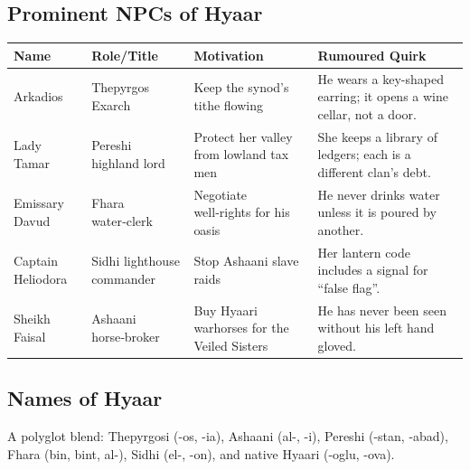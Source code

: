 \documentclass[11pt]{book}
\begin{document}
\subsection*{Prominent NPCs of Hyaar}
\begin{longtable}{|p{}|p{}|p{}|p{}|}
\hline
\textbf{Name} & \textbf{Role/Title} & \textbf{Motivation} & \textbf{Rumoured Quirk} \\
\hline
Arkadios & Thepyrgos Exarch & Keep the synod’s tithe flowing & He wears a key-shaped earring; it opens a wine cellar, not a door. \\
\hline
Lady Tamar & Pereshi highland lord & Protect her valley from lowland tax men & She keeps a library of ledgers; each is a different clan’s debt. \\
\hline
Emissary Davud & Fhara water‑clerk & Negotiate well‑rights for his oasis & He never drinks water unless it is poured by another. \\
\hline
Captain Heliodora & Sidhi lighthouse commander & Stop Ashaani slave raids & Her lantern code includes a signal for “false flag”. \\
\hline
Sheikh Faisal & Ashaani horse‑broker & Buy Hyaari warhorses for the Veiled Sisters & He has never been seen without his left hand gloved. \\
\hline
\end{longtable}

\subsection*{Names of Hyaar}
A polyglot blend: Thepyrgosi (-os, -ia), Ashaani (al-, -i), Pereshi (-stan, -abad), Fhara (bin, bint, al-), Sidhi (el-, -on), and native Hyaari (-oglu, -ova).
\end{document}
